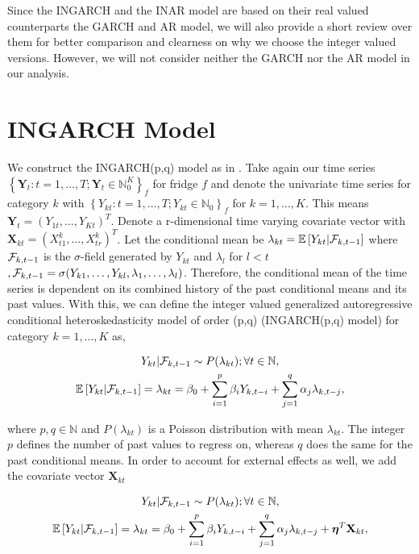 Since the INGARCH and the INAR model are based on their real valued counterparts the GARCH and AR model, we will also provide a short review over them for better comparison and clearness on why we choose the integer valued versions. However, we will not consider neither the GARCH nor the AR model in our analysis. 

\section{INGARCH Model}
\label{sec:Ingarch}

We construct the INGARCH(p,q) model as in \cite{Liboschik:2016}. 
Take again our time series $\left\{\bm{Y}_t:t=1,\ldots,T; \bm{Y}_t \in \mathbb{N}_0^K \right\}_f$ for fridge $f$ and denote the univariate time series for category $k$ with $\left\{Y_{kt}:t=1,\ldots,T; Y_{kt} \in \mathbb{N}_0\right\}_f$  for $k=1,\ldots,K$. This means $\bm{Y}_t = (Y_{1t},\ldots,Y_{Kt})^T$. Denote a r-dimensional time varying covariate vector with $\textbf{X}_{kt}=(X_{t1}^k,\ldots,X_{tr}^k)^T$. Let the conditional mean be $\lambda_{kt} = \mathbb{E}\left[Y_{kt} | \mathcal{F}_{k,t-1} \right]$ where $\mathcal{F}_{k,t-1}$ is the $\sigma$-field generated by $Y_{kt}$ and $\lambda_l$ for $l<t$ $, \mathcal{F} _{k,t-1}= \sigma(Y_{k1},\ldots,Y_{kl},\lambda_1, \ldots, \lambda_l)$. Therefore, the conditional mean of the time series is dependent on its combined history of the past conditional means and its past values. With this, we can define the integer valued generalized autoregressive conditional heteroskedasticity model of order (p,q) (INGARCH(p,q) model) for category $k=1,\ldots,K$ as,

\begin{gather}
\label{eq:Ingarch model}
Y_{kt} | \mathcal{F}_{k,t-1} \sim P(\lambda_{kt}); \forall t \in \mathbb{N}, \\
\mathbb{E}\left[Y_{kt} | \mathcal{F}_{k,t-1} \right] = \lambda_{kt} = \beta_0 + \sum_{i=1}^p\beta_i Y_{k,t-i} + \sum_{j=1}^q\alpha_j \lambda_{k,t-j},
\end{gather}

where $p,q \in \mathbb{N}$ and $P(\lambda_{kt})$ is a Poisson distribution with mean $\lambda_{kt}$. The integer $p$ defines the number of past values to regress on, whereas $q$ does the same for the past conditional means. In order to account for external effects as well, we add the covariate vector $\textbf{X}_{kt}$

\begin{gather}
\label{eq:Ingarch model with external effect}
Y_{kt} | \mathcal{F}_{k,t-1} \sim P(\lambda_{kt}); \forall t \in \mathbb{N}, \\
\mathbb{E}\left[Y_{kt} | \mathcal{F}_{k,t-1} \right] = \lambda_{kt} = \beta_0 + \sum_{i=1}^p\beta_i Y_{k,t-i} + \sum_{j=1}^q\alpha_j \lambda_{k,t-j} + \bm{\eta}^T\textbf{X}_{kt},
\end{gather}

